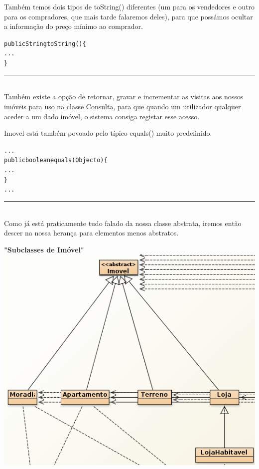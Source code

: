 \documentclass[12pt]{article}
\newenvironment{code}                    
{\textbf{
} \hspace{1cm} \hrulefill \\ 
\smallskip 
\begin{center}
\begin{minipage}{0.9\textwidth} 
\begin{alltt}\small}
{\end{alltt}
\end{minipage}
\end{center}
\hrule\smallskip
}
\begin{document}
Também temos dois tipos de toString() diferentes (um para os vendedores e outro para os compradores, que mais tarde falaremos deles), para que possámos ocultar a informação do preço mínimo ao comprador.
\newline
\begin{code}
public String toString()\{
...
\}
\end{code}
~\\

Também existe a opção de retornar, gravar e incrementar as visitas aos nossos imóveis para uso na classe Consulta, para que quando um utilizador qualquer aceder a um dado imóvel, o sistema consiga registar esse acesso.
\newline

Imovel está também povoado pelo típico equals() muito predefinido.
\newline
\begin{code}
...
public boolean equals(Object o)\{
...
\}
...
\end{code}
~\\

Como já está praticamente tudo falado da nossa classe abstrata, iremos então descer na nossa herança para elementos menos abstratos.
\pagebreak

\textbf{"Subclasses de Imóvel"}
\newline
\newline
\includegraphics[scale=0.5]{003.png}	
\newline
\end{document}
